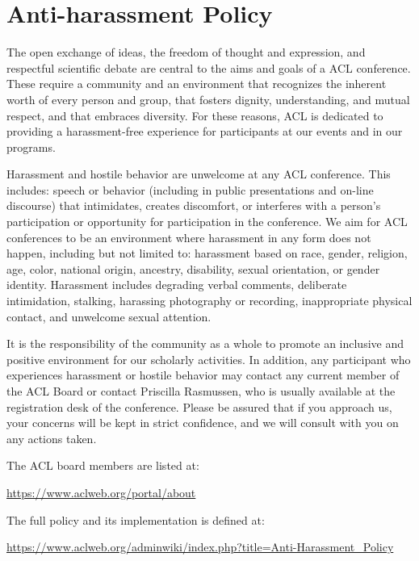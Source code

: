\chapter[Anti-harassment Policy]{Anti-harassment Policy}
\thispagestyle{emptyheader}

The open exchange of ideas, the freedom of thought and expression, and
respectful scientific debate are central to the aims and goals of a
ACL conference. These require a community and an environment that
recognizes the inherent worth of every person and group, that fosters
dignity, understanding, and mutual respect, and that embraces
diversity. For these reasons, ACL is dedicated to providing a
harassment-free experience for participants at our events and in our
programs. 

Harassment and hostile behavior are unwelcome at any ACL
conference. This includes: speech or behavior (including in public
presentations and on-line discourse) that intimidates, creates
discomfort, or interferes with a person’s participation or opportunity
for participation in the conference. We aim for ACL conferences to
be an environment where harassment in any form does not happen,
including but not limited to: harassment based on race, gender,
religion, age, color, national origin, ancestry, disability, sexual
orientation, or gender identity. Harassment includes degrading verbal
comments, deliberate intimidation, stalking, harassing photography or
recording, inappropriate physical contact, and unwelcome sexual
attention. 

It is the responsibility of the community as a whole to promote an
inclusive and positive environment for our scholarly activities. In
addition, any participant who experiences harassment or hostile
behavior may contact any current member of the ACL Board or contact
Priscilla Rasmussen, who is usually available at the registration desk
of the conference. Please be assured that if you approach us, your
concerns will be kept in strict confidence, and we will consult with
you on any actions taken. 

The ACL board members are listed at:

\url{https://www.aclweb.org/portal/about}

The full policy and its implementation is defined at:

\url{https://www.aclweb.org/adminwiki/index.php?title=Anti-Harassment_Policy}
